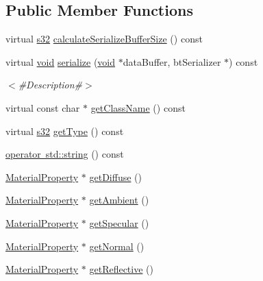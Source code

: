 \subsection*{Public Member Functions}
\begin{DoxyCompactItemize}
\item 
virtual \mbox{\hyperlink{_util_8h_aa62c75d314a0d1f37f79c4b73b2292e2}{s32}} \mbox{\hyperlink{classnjli_1_1_material_a07a92910ef8da284641f6eb70a30e3be}{calculate\+Serialize\+Buffer\+Size}} () const
\item 
virtual \mbox{\hyperlink{_thread_8h_af1e856da2e658414cb2456cb6f7ebc66}{void}} \mbox{\hyperlink{classnjli_1_1_material_a3ab82dce5ced09f9caaf974e24088aa2}{serialize}} (\mbox{\hyperlink{_thread_8h_af1e856da2e658414cb2456cb6f7ebc66}{void}} $\ast$data\+Buffer, bt\+Serializer $\ast$) const
\begin{DoxyCompactList}\small\item\em $<$\#\+Description\#$>$ \end{DoxyCompactList}\item 
virtual const char $\ast$ \mbox{\hyperlink{classnjli_1_1_material_aaea36cd9ab4ea05af15a0a260d853d8e}{get\+Class\+Name}} () const
\item 
virtual \mbox{\hyperlink{_util_8h_aa62c75d314a0d1f37f79c4b73b2292e2}{s32}} \mbox{\hyperlink{classnjli_1_1_material_a13708ffb8342a5d988d0acddb31af07f}{get\+Type}} () const
\item 
\mbox{\hyperlink{classnjli_1_1_material_a3b6cbb2dfeef53995d862414fac28345}{operator std\+::string}} () const
\item 
\mbox{\hyperlink{classnjli_1_1_material_property}{Material\+Property}} $\ast$ \mbox{\hyperlink{classnjli_1_1_material_a389857d136e1a7ab61bb0dfd4a6e2e7c}{get\+Diffuse}} ()
\item 
\mbox{\hyperlink{classnjli_1_1_material_property}{Material\+Property}} $\ast$ \mbox{\hyperlink{classnjli_1_1_material_aa29ca4337009ceae601d7e109585d70a}{get\+Ambient}} ()
\item 
\mbox{\hyperlink{classnjli_1_1_material_property}{Material\+Property}} $\ast$ \mbox{\hyperlink{classnjli_1_1_material_afc56ace85ceb0366d6419f4802a3bac6}{get\+Specular}} ()
\item 
\mbox{\hyperlink{classnjli_1_1_material_property}{Material\+Property}} $\ast$ \mbox{\hyperlink{classnjli_1_1_material_a5823254059c86af02c20994309e081d8}{get\+Normal}} ()
\item 
\mbox{\hyperlink{classnjli_1_1_material_property}{Material\+Property}} $\ast$ \mbox{\hyperlink{classnjli_1_1_material_a33a6626c6e0311e027eece10bb9c92fc}{get\+Reflective}} ()

\end{DoxyCompactItemize}
